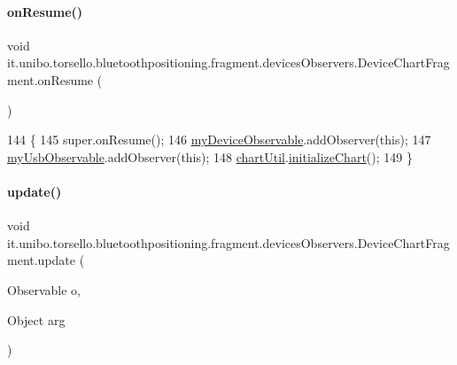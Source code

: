 \paragraph{\texorpdfstring{on\+Resume()}{onResume()}}
{\footnotesize\ttfamily void it.\+unibo.\+torsello.\+bluetoothpositioning.\+fragment.\+devices\+Observers.\+Device\+Chart\+Fragment.\+on\+Resume (\begin{DoxyParamCaption}{ }\end{DoxyParamCaption})}


\begin{DoxyCode}
144                            \{
145         super.onResume();
146         \hyperlink{classit_1_1unibo_1_1torsello_1_1bluetoothpositioning_1_1fragment_1_1devicesObservers_1_1DeviceChartFragment_a2c8de6418fffdb5affe4de22185b55eb_a2c8de6418fffdb5affe4de22185b55eb}{myDeviceObservable}.addObserver(\textcolor{keyword}{this});
147         \hyperlink{classit_1_1unibo_1_1torsello_1_1bluetoothpositioning_1_1fragment_1_1devicesObservers_1_1DeviceChartFragment_a577dad67b3eabc0f48e95d08e9f5881b_a577dad67b3eabc0f48e95d08e9f5881b}{myUsbObservable}.addObserver(\textcolor{keyword}{this});
148         \hyperlink{classit_1_1unibo_1_1torsello_1_1bluetoothpositioning_1_1fragment_1_1devicesObservers_1_1DeviceChartFragment_afe4ee0e5d07f3efb6887428c9ef04a2e_afe4ee0e5d07f3efb6887428c9ef04a2e}{chartUtil}.\hyperlink{classit_1_1unibo_1_1torsello_1_1bluetoothpositioning_1_1util_1_1ChartUtil_aab1a6bd41cbf8228c53d633af6b89bb7_aab1a6bd41cbf8228c53d633af6b89bb7}{initializeChart}();
149     \}
\end{DoxyCode}
\hypertarget{classit_1_1unibo_1_1torsello_1_1bluetoothpositioning_1_1fragment_1_1devicesObservers_1_1DeviceChartFragment_a83fb3f76a108192b8df7640cfafcd98d_a83fb3f76a108192b8df7640cfafcd98d}{}\label{classit_1_1unibo_1_1torsello_1_1bluetoothpositioning_1_1fragment_1_1devicesObservers_1_1DeviceChartFragment_a83fb3f76a108192b8df7640cfafcd98d_a83fb3f76a108192b8df7640cfafcd98d} 
\paragraph{\texorpdfstring{update()}{update()}}
{\footnotesize\ttfamily void it.\+unibo.\+torsello.\+bluetoothpositioning.\+fragment.\+devices\+Observers.\+Device\+Chart\+Fragment.\+update (\begin{DoxyParamCaption}\item[{Observable}]{o,  }\item[{Object}]{arg }\end{DoxyParamCaption})}


